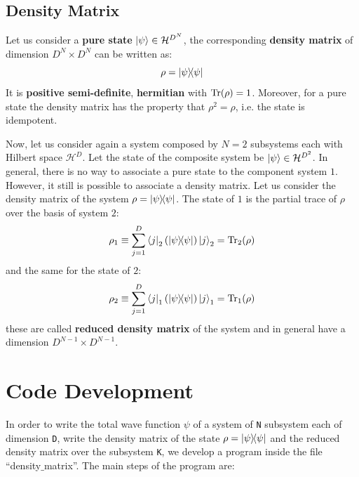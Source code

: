 \documentclass[rmp,10pt,onecolumn,fleqn,notitlepage]{revtex4-1}
\begin{document}
\subsection{Density Matrix}
Let us consider a \textbf{pure state}  \( \ket{\psi } \in \mathcal{H}^{D^N} \), the corresponding \textbf{density matrix} of dimension \( D^N \times D^N \) can be written as:
\begin{equation}
  \rho = \ketbra{\psi }{\psi }
\end{equation}
It is \textbf{positive semi-definite}, \textbf{hermitian} with \( \Tr(\rho ) = 1  \). Moreover, for a pure state the density matrix has the property that \( \rho ^2 = \rho  \), i.e. the state is idempotent.

Now, let us consider again a system composed by \( N=2 \) subsystems each with Hilbert space \( \mathcal{H}^D \). Let the state of the composite system be \( \ket{\psi } \in \mathcal{H}^{D^2}  \).
In general, there is no way to associate a pure state to the component system $1$.  However, it still is possible to associate a density matrix. Let us consider the density matrix of the system \( \rho = \ketbra{\psi }{\psi }  \). The state of $1$ is the partial trace of \( \rho  \) over the basis of system $2$:
\begin{equation}
  \rho _1 \equiv  \sum_{j=1}^{D} \bra{j}_2 (\ketbra{\psi }{\psi } ) \ket{j}_2 = \Tr_2(\rho )
\end{equation}
and the same for the state of \( 2 \):
\begin{equation}
  \rho _2 \equiv  \sum_{j=1}^{D} \bra{j}_1 (\ketbra{\psi }{\psi } ) \ket{j}_1 = \Tr_1(\rho )
\end{equation}
these are called \textbf{reduced density matrix} of the system and in general have a dimension \( D^{N-1} \times D^{N-1} \). 



\clearpage

\section{Code Development}

In order to write the total wave function \( \psi  \) of a system of \texttt{N} subsystem each of dimension \texttt{D}, write the density matrix of the state \( \rho  = \ketbra{\psi }{\psi }  \) and the reduced density matrix over the subsystem \texttt{K}, we develop a program inside the file “density$\_$matrix”.
The main steps of the program are:
\end{document}
